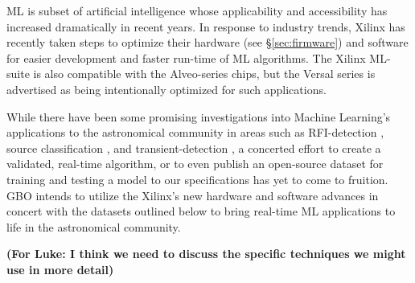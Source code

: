 \documentclass[10pt]{myNSF}
\begin{document}
 ML is subset of artificial intelligence
whose applicability and accessibility has increased dramatically in
recent years. In response to industry trends, Xilinx has recently
taken steps to optimize their hardware (see \S\ref{sec:firmware}) and
software for easier development and faster run-time of ML algorithms.
The Xilinx ML-suite is also compatible with the Alveo-series chips,
but the Versal series is advertised as being intentionally optimized
for such applications.

While there have been some promising investigations into Machine
Learning’s applications to the astronomical community in areas such as
RFI-detection \citep{wol16}, source classification
\citep{zbm+14,at17}, and transient-detection \citep{zgf+18}, a
concerted effort to create a validated, real-time algorithm, or to
even publish an open-source dataset for training and testing a model
to our specifications has yet to come to fruition.  GBO intends to
utilize the Xilinx's new hardware and software advances in concert
with the datasets outlined below to bring real-time ML applications to
life in the astronomical community.

\textbf{(For Luke: I think we need to discuss the specific techniques
  we might use in more detail)}
\end{document}
